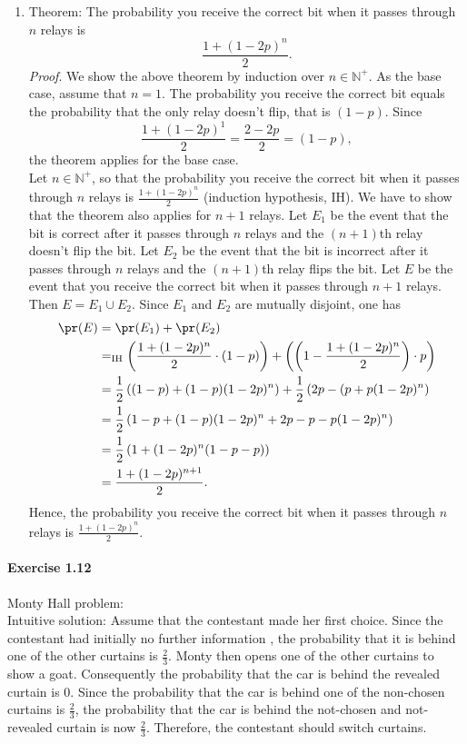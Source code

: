 \begin{enumerate}
   \item[(c)] Theorem: The probability you receive the correct bit when it passes
    through $n$ relays is
    \[ \frac{1 + (1 - 2p)^n}{2}. \]
    \textit{Proof}. We show the above theorem by induction over $n \in \mathbb{N}^+$.
    As the base case, assume that $n = 1$. The probability you receive the correct
    bit equals the probability that the only relay doesn't flip, that is $(1 - p)$.
    Since
    \[ \frac{1 + (1 - 2p)^1}{2} = \frac{2 - 2p}{2} = (1 - p), \]
    the theorem applies for the base case. \\
    Let $n \in \mathbb{N}^+$, so that the probability you receive the correct bit
    when it passes through $n$ relays is $\frac{1 + (1 - 2p)^n}{2}$ (induction
    hypothesis, IH). We have to show that the theorem also applies for $n+1$
    relays. Let $E_1$ be the event that the bit is correct after it passes through
    $n$ relays and the $(n+1)$th relay doesn't flip the bit. Let $E_2$ be the
    event that the bit is incorrect after it passes through $n$ relays and the
    $(n+1)$th relay flips the bit. Let $E$ be the event that you receive the correct
    bit when it passes through $n + 1$ relays. Then $E = E_1 \cup E_2$. Since
    $E_1$ and $E_2$ are mutually disjoint, one has
    \begin{align*}
      \pr(E)
      &= \pr(E_1) + \pr(E_2) \\
      &=_{\text{IH}}  \left( \frac{1 + (1 - 2p)^n}{2} \cdot (1 - p) \right) +
        \left( \left( 1 - \frac{1 + (1 - 2p)^n}{2} \right) \cdot p \right) \\
      &= \frac{1}{2} \left( (1-p) + (1-p)(1 - 2p)^n \right) +
        \frac{1}{2} \left( 2p - (p + p(1 - 2p)^n \right) \\
      &= \frac{1}{2} \left( 1 - p + (1-p)(1 - 2p)^n + 2p - p - p(1 - 2p)^n \right) \\
      &= \frac{1}{2} \left( 1  + (1 - 2p)^n(1 - p - p) \right) \\
      &= \frac{1  + (1 - 2p)^{n+1}}{2}.
    \end{align*}
    Hence, the probability you receive the correct bit when it passes through $n$
    relays is $\frac{1 + (1 - 2p)^n}{2}$.
 \end{enumerate}

\paragraph{Exercise 1.12} Monty Hall problem: \\
Intuitive solution: Assume that the contestant made her first choice. Since the
contestant had initially no further information , the probability that it is
behind one of the other curtains is $\frac{2}{3}$. Monty then opens one of the
other curtains to show a goat. Consequently the probability that the car is behind
the revealed curtain is 0. Since the probability that the car is behind one
of the non-chosen curtains is $\frac{2}{3}$, the probability that the car is behind
the not-chosen and not-revealed curtain is now $\frac{2}{3}$. Therefore, the
contestant should switch curtains.

